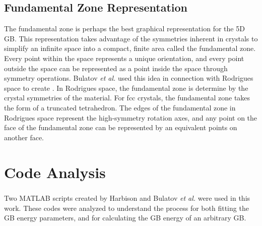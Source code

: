 \documentclass[12pt]{report}
\begin{document}
\subsection{Fundamental Zone Representation}
The fundamental zone is perhaps the best graphical representation for the 5D GB.  This representation takes advantage of the symmetries inherent in crystals\cite{stokes2007} to simplify an infinite space into a compact, finite area called the fundamental zone.\cite{bulatov2014, patala2013, homer2015, morawiec1996, patala2012}  Every point within the space represents a unique orientation, and every point outside the space can be represented as a point inside the space through symmetry operations.\cite{morawiec1996, becker1989, frank1988}  Bulatov \emph{et al.} used this idea in connection with Rodrigues space to create .  In Rodrigues space, the fundamental zone is determine by the crystal symmetries of the material.\cite{patala2013, morawiec1996}  For fcc crystals, the fundamental zone takes the form of a truncated tetrahedron.\cite{bulatov2014}  The edges of the fundamental zone in Rodrigues space represent the high-symmetry rotation axes, and any point on the face of the fundamental zone can be represented by an equivalent points on another face.  

\section{Code Analysis}
Two MATLAB\textsuperscript{\textregistered} scripts created by Harbison\cite{harbison2015} and Bulatov \emph{et al.}\cite{bulatov2014} were used in this work.  These codes were analyzed to understand the process for both fitting the GB energy parameters, and for calculating the GB energy of an arbitrary GB.
\end{document}

